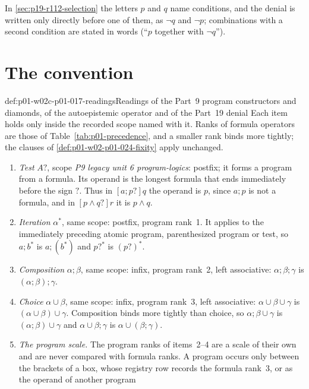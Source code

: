 In \cref{sec:p19-r112-selection} the letters \(p\) and \(q\) name
conditions, and the denial is written only directly before one of them,
as \(\neg q\) and \(\neg p\); combinations with a second condition are
stated in words (``\(p\) together with \(\neg q\)'').

\section{The convention}
\label{sec:p01-w02c-p01-017-convention}

\begin{hbconvention}{def:p01-w02c-p01-017-readings}{Readings of the Part~9 program constructors and diamonds, of the autoepistemic operator and of the Part~19 denial}
Each item holds only inside the recorded scope named with it.  Ranks of
formula operators are those of Table~\ref{tab:p01-precedence}, and a
smaller rank binds more tightly; the clauses of
\cref{def:p01-w02-p01-024-fixity} apply unchanged.
\begin{enumerate}
\item \emph{Test} \(A?\), scope \emph{P9 legacy unit 6 program-logics}:
  postfix; it forms a program from a formula.  Its operand is the longest
  formula that ends immediately before the sign \(?\).  Thus in \([a;p?]q\)
  the operand is \(p\), since \(a;p\) is not a formula, and in
  \([p\land q?]r\) it is \(p\land q\).
\item \emph{Iteration} \(\alpha^{*}\), same scope: postfix, program
  rank~1.  It applies to the immediately preceding atomic program,
  parenthesized program or test, so \(a;b^{*}\) is \(a;(b^{*})\) and
  \(p?^{*}\) is \((p?)^{*}\).
\item \emph{Composition} \(\alpha;\beta\), same scope: infix, program
  rank~2, left associative: \(\alpha;\beta;\gamma\) is
  \((\alpha;\beta);\gamma\).
\item \emph{Choice} \(\alpha\cup\beta\), same scope: infix, program
  rank~3, left associative: \(\alpha\cup\beta\cup\gamma\) is
  \((\alpha\cup\beta)\cup\gamma\).  Composition binds more tightly than
  choice, so \(\alpha;\beta\cup\gamma\) is \((\alpha;\beta)\cup\gamma\) and
  \(\alpha\cup\beta;\gamma\) is \(\alpha\cup(\beta;\gamma)\).
\item \emph{The program scale.}  The program ranks of items~2--4 are a
  scale of their own and are never compared with formula ranks.  A
  program occurs only between the brackets of a box, whose registry row
  records the formula rank~3, or as the operand of another program

\end{enumerate}
\end{hbconvention}
